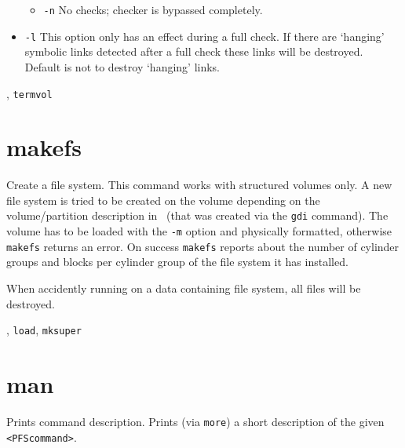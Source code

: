\begin{man}
\begin{itemize}
\begin{itemize}
               \item {\tt -n}\newline
                 No checks; checker is bypassed completely.
               \end{itemize}

             \item {\tt -l}\newline
               This option only has an effect during a full check.
	       If there are `hanging' symbolic links detected after a full
               check these links will be destroyed. Default is not to destroy
               `hanging' links.
             \end{itemize}

  , {\tt termvol}
\end{man}

\section{makefs}
\begin{man}
  \PP Create a file system.
  \DE This command works with structured volumes only.
             A new file system is tried to be created on the volume depending
             on the volume\slash partition description in \HEDI\ (that was
             created via the {\tt gdi} command). The volume has to be loaded with
             the {\tt -m} option and physically formatted, otherwise {\tt makefs} returns
             an error. On success {\tt makefs} reports about the number of cylinder
             groups and blocks per cylinder group of the file system it has
             installed.

             \begin{caution}
               When accidently running on a data containing file system, all
               files will be destroyed.
             \end{caution}
  , {\tt load}, {\tt mksuper}
\end{man}

\section{man}
\begin{man}
  \PP Prints command description.
  \DE Prints (via {\tt more}) a short description of the given {\tt <PFScommand>}.
\end{man}

